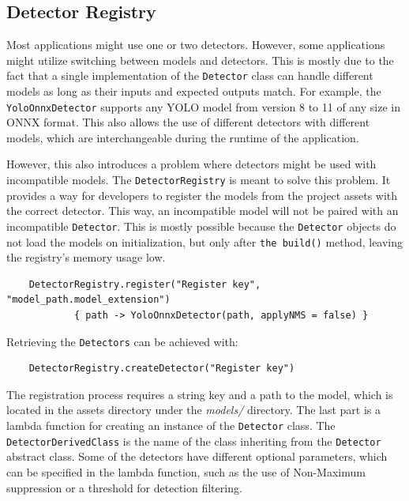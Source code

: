 \subsection{Detector Registry}
\label{DetectorRegistry}
Most applications might use one or two detectors. However, some applications might utilize switching between models and detectors. This is mostly due to the fact that a single implementation of the \texttt{Detector} class can handle different models as long as their inputs and expected outputs match. For example, the \texttt{YoloOnnxDetector} supports any YOLO model from version 8 to 11 of any size in ONNX format. This also allows the use of different detectors with different models, which are interchangeable during the runtime of the application. 

However, this also introduces a problem where detectors might be used with incompatible models. The \texttt{DetectorRegistry} is meant to solve this problem. It provides a way for developers to register the models from the project assets with the correct detector. This way, an incompatible model will not be paired with an incompatible \texttt{Detector}. This is mostly possible because the \texttt{Detector} objects do not load the models on initialization, but only after \texttt{the build()} method, leaving the registry's memory usage low.

\begin{lstlisting}
    DetectorRegistry.register("Register key", "model_path.model_extension")
            { path -> YoloOnnxDetector(path, applyNMS = false) }
\end{lstlisting}
Retrieving the \texttt{Detectors} can be achieved with:
\begin{lstlisting}
    DetectorRegistry.createDetector("Register key")
\end{lstlisting}

The registration process requires a string key and a path to the model, which is located in the assets directory under the \textit{models/} directory. The last part is a lambda function for creating an instance of the \texttt{Detector} class. The \texttt{DetectorDerivedClass} is the name of the class inheriting from the \texttt{Detector} abstract class. Some of the detectors have different optional parameters, which can be specified in the lambda function, such as the use of Non-Maximum suppression or a threshold for detection filtering. 


